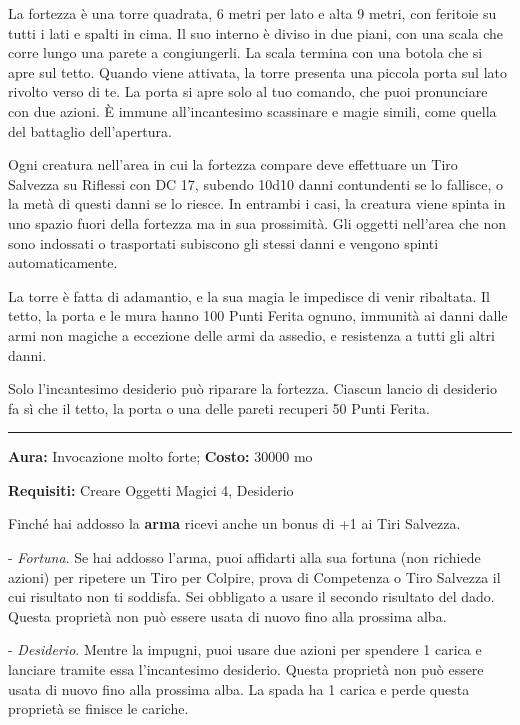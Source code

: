 \begin{multicols}{2}
La fortezza è una torre quadrata, 6 metri per lato e alta 9 metri, con feritoie su tutti i lati e spalti in cima. Il suo interno è diviso in due piani, con una scala che corre lungo una parete a congiungerli. La scala termina con una botola che si apre sul tetto. Quando viene attivata, la torre presenta una piccola porta sul lato rivolto verso di te. La porta si apre solo al tuo comando, che puoi pronunciare con due azioni. È immune all'incantesimo scassinare e magie simili, come quella del battaglio dell'apertura.

Ogni creatura nell'area in cui la fortezza compare deve effettuare un Tiro Salvezza su Riflessi con DC 17, subendo 10d10 danni contundenti se lo fallisce, o la metà di questi danni se lo riesce. In entrambi i casi, la creatura viene spinta in uno spazio fuori della fortezza ma in sua prossimità. Gli oggetti nell'area che non sono indossati o trasportati subiscono gli stessi danni e vengono spinti automaticamente.

La torre è fatta di adamantio, e la sua magia le impedisce di venir ribaltata. Il tetto, la porta e le mura hanno 100 Punti Ferita ognuno, immunità ai danni dalle armi non magiche a eccezione delle armi da assedio, e resistenza a tutti gli altri danni.

Solo l'incantesimo desiderio può riparare la fortezza. Ciascun lancio di desiderio fa sì che il tetto, la porta o una delle pareti recuperi 50 Punti Ferita.

\smallskip\noindent\rule{\linewidth}{2pt}  \hypertarget{Fortunata}{}\smallskip{}\noindent\label{Fortunata}

\textbf{Aura:} Invocazione molto forte; \textbf{Costo:} 30000 mo

\textbf{Requisiti:} Creare Oggetti Magici 4, Desiderio

Finché hai addosso la \textbf{arma} ricevi anche un bonus di +1 ai Tiri Salvezza.

- \emph{Fortuna}. Se hai addosso l'arma, puoi affidarti alla sua fortuna (non richiede azioni) per ripetere un Tiro per Colpire, prova di Competenza o Tiro Salvezza il cui risultato non ti soddisfa. Sei obbligato a usare il secondo risultato del dado. Questa proprietà non può essere usata di nuovo fino alla prossima alba.

- \emph{Desiderio}. Mentre la impugni, puoi usare due azioni per spendere 1 carica e lanciare tramite essa l'incantesimo desiderio. Questa proprietà non può essere usata di nuovo fino alla prossima alba. La spada ha 1 carica e perde questa proprietà se finisce le cariche.


\end{multicols}
